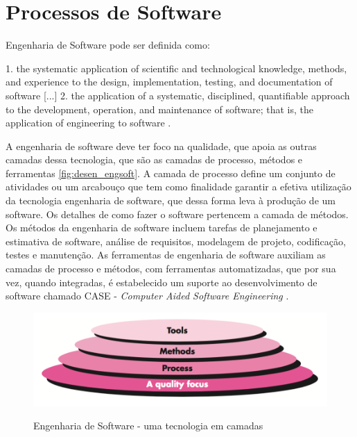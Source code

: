 \section{Processos de Software}

Engenharia de Software pode ser definida como:
\begin{citacao}[english]
1. the systematic application of scientific and technological knowledge, methods, and experience to the design,
implementation, testing, and documentation of software [...]  2. the application
of a systematic, disciplined, quantifiable approach to the development, operation,
and maintenance of software; that is, the application of engineering to software \cite{IEEE2010}.
\end{citacao}

A engenharia de software deve ter foco na qualidade, que apoia as outras camadas
dessa tecnologia, que são as camadas de processo, métodos e ferramentas \autoref{fig:desen_engsoft}.
A camada de processo define um conjunto de atividades ou um arcabouço que tem
como finalidade garantir a efetiva utilização da tecnologia engenharia de software, que dessa forma
leva à produção de um software. Os detalhes de como fazer o software pertencem
a camada de métodos. Os métodos da engenharia de software incluem tarefas de planejamento
e estimativa de software, análise de requisitos, modelagem de projeto, codificação,
testes e manutenção. As ferramentas de engenharia de software auxiliam as camadas de
processo e métodos, com ferramentas automatizadas, que por sua vez, quando integradas,
é estabelecido um suporte ao desenvolvimento de software chamado CASE -
\textit{Computer Aided Software Engineering} \cite{Pressman2009, Sommerville2006}.

\begin{figure}[b]
  \centering
  \caption{Engenharia de Software - uma tecnologia em camadas}
  \includegraphics[scale=0.3]{imagens/desenv_engsoft2}
  \label{fig:desen_engsoft}
\end{figure}


